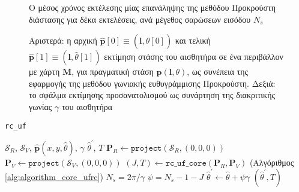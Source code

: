 \begin{figure}[!h]\centering
  
  \caption{\small Ο μέσος χρόνος εκτέλεσης μίας επανάληψης της μεθόδου
           Προκρούστη διάστασης για δέκα εκτελέσεις, ανά μέγεθος σαρώσεων εισόδου
           $N_s$}
  \label{fig:02_04_02:rc_uf_exec_time}
\end{figure}

\begin{figure}[!h]\centering
  \vspace{0.5cm}
  
  \vspace{0.5cm}
  \caption{\small Αριστερά: η αρχική
           $\hat{\bm{p}}[0] \equiv (\bm{l},\hat{\theta}[0])$ και τελική
           $\hat{\bm{p}}[1] \equiv (\bm{l},\hat{\theta}[1])$ εκτίμηση στάσης του
           αισθητήρα σε ένα περιβάλλον με χάρτη $\bm{M}$, για πραγματική στάση
           $\bm{p}(\bm{l},\theta)$, ως συνέπεια της εφαρμογής της μεθόδου
           γωνιακής ευθυγράμμισης Προκρούστη. Δεξιά: το σφάλμα εκτίμησης
           προσανατολισμού ως συνάρτηση της διακριτικής γωνίας $\gamma$ του
           αισθητήρα}
  \label{fig:02_04_02:rc_uf}
\end{figure}


\begin{algorithm}[!h]
  \caption{\texttt{rc\_uf}}
  \begin{spacing}{1.3}
  \begin{algorithmic}[1]
    \REQUIRE $\mathcal{S}_R$, $\mathcal{S}_V$, $\hat{\bm{p}}(x, y, \hat{\theta})$, $\gamma$
    \ENSURE $\hat{\theta}^\prime$, $T$
    \STATE $\bm{P}_R \leftarrow \texttt{project}(\mathcal{S}_R, (0,0,0))$
    \STATE $\bm{P}_V \leftarrow \texttt{project}(\mathcal{S}_V, (0,0,0))$
    \STATE $(J,T) \leftarrow \texttt{rc\_uf\_core}(\bm{P}_R, \bm{P}_V)$ (Αλγόριθμος \ref{alg:algorithm_core_ufrc})
    \STATE $N_s = 2 \pi / \gamma$
    \STATE $\psi = N_s - 1 - J$
    \STATE $\hat{\theta}^\prime \leftarrow \hat{\theta} + \psi \gamma$
    \RETURN $(\hat{\theta}^\prime, T)$
  \end{algorithmic}
  \end{spacing}
  \label{alg:algorithm_ufrc}
\end{algorithm}


